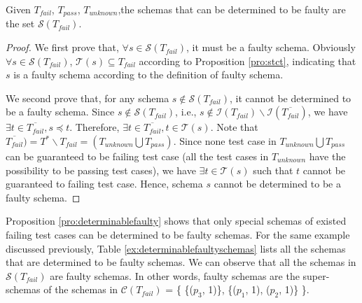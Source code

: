 \begin{proposition}\label{pro:determinablefaulty}
Given  $T_{fail}$, $T_{pass}$, $T_{unknown}$,the schemas that can be determined to be faulty are the set $\mathcal{S}(T_{fail})$.
\end{proposition}

\begin{proof}
We first prove that, $\forall s \in \mathcal{S}(T_{fail})$, it must be a faulty schema.
Obviously $\forall s \in \mathcal{S}(T_{fail})$, $\mathcal{T}(s) \subseteq T_{fail}$ according to Proposition \ref{pro:stct}, indicating that $s$ is a faulty schema according to the definition of faulty schema.

We second prove that, for any schema $s \not\in \mathcal{S}(T_{fail})$, it cannot be determined to be a faulty schema. Since $s \not\in \mathcal{S}(T_{fail})$, i.e., $s \not\in \mathcal{I}(T_{fail})\backslash \mathcal{I}(\overline{T_{fail}})$, we have $\exists t \in \overline{T_{fail}}, s \preceq t$. Therefore,  $\exists t \in \overline{T_{fail}}, t \in \mathcal{T}(s)$. Note that $\overline{T_{fail}}) = T^{*} \backslash T_{fail} =  (T_{unknown} \bigcup T_{pass})$. Since none test case in $T_{unknown} \bigcup T_{pass}$ can be guaranteed to be failing test case (all the test cases in $T_{unknown}$ have the possibility to be passing test cases), we have $\exists t \in \mathcal{T}(s)$ such that $t$ cannot be guaranteed to failing test case.  Hence, schema $s$ cannot be determined to be a faulty schema.
\end{proof}

Proposition \ref{pro:determinablefaulty} shows that only special schemas of existed failing test cases can be determined to be faulty schemas.  For the same example discussed previously, Table \ref{ex:determinablefaultyschemas} lists all the schemas that are determined to be faulty schemas.
We can observe that all the schemas in $\mathcal{S}(T_{fail})$ are faulty schemas. In other words, faulty schemas are the super-schemas of the schemas in $\mathcal{C}(T_{fail})$ = \{ \{($p_{3}$, 1)\}, \{($p_{1}$, 1), ($p_{2}$, 1)\} \}.

